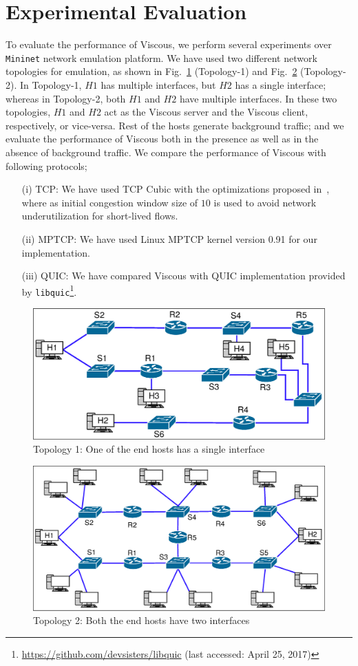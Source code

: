 \section{Experimental Evaluation}

To evaluate the performance of Viscous, we perform several experiments over \texttt{Mininet} network emulation platform. We have used two different network topologies for emulation, as shown in Fig.~\ref{fig:experimentalTopology1} (Topology-1) and Fig.~\ref{fig:experimentalTopology2} (Topology-2). In Topology-1, $H1$ has multiple interfaces, but $H2$ has a single interface; whereas in Topology-2, both $H1$ and $H2$ have multiple interfaces. In these two topologies, $H1$ and $H2$ act as the Viscous server and the Viscous client, respectively, or vice-versa. Rest of the hosts generate background traffic; and we evaluate the performance of Viscous both in the presence as well as in the absence of background traffic.  We compare the performance of Viscous with following protocols;
\begin{enumerate}
	\item[(i)] TCP: We have used TCP Cubic with the optimizations proposed in~\cite{largecwnd}, where as initial congestion window size of $10$ is used to avoid network underutilization for short-lived flows. 
	\item[(ii)] MPTCP: We have used Linux MPTCP kernel version 0.91 for our implementation.
	\item [(iii)] QUIC: We have compared Viscous with QUIC implementation provided by \texttt{libquic}\footnote{\url{https://github.com/devsisters/libquic} (last accessed: April 25, 2017)}. 
\end{enumerate}

\begin{figure}[!ht]
	\centering
	\includegraphics[width=0.7\linewidth]{img/experimentalTopology1}
	\caption{Topology 1: One of the end hosts has a single interface}
	\label{fig:experimentalTopology1}
\end{figure}

\begin{figure}[!ht]
	\centering
	\includegraphics[width=0.7\linewidth]{img/experimentalTopology2}
	\caption{Topology 2: Both the end hosts have two interfaces}
	\label{fig:experimentalTopology2}
\end{figure}



